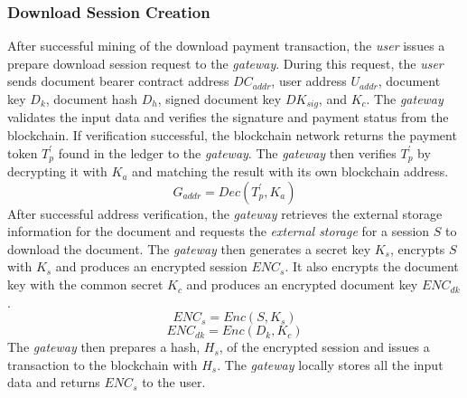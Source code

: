 \subsubsection{Download Session Creation}
After successful mining of the download payment transaction, the {\it user} issues a prepare download session request to the {\it gateway}. During this request, the {\it user} sends document bearer contract address $DC_{addr}$, user address $U_{addr}$, document key $D_k$, document hash $D_h$, signed document key $DK_{sig}$, and $K_c$. The {\it gateway} validates the input data and verifies the signature and payment status from the blockchain. If verification successful, the blockchain network returns the payment token $T_p^\prime$ found in the ledger to the {\it gateway}. The {\it gateway} then verifies $T_p^\prime$ by decrypting it with $K_a$ and matching the result with its own blockchain address. 
\begin{equation}
\label{eq-d-3}
G_{addr} = Dec (T_p^\prime, K_a)
\end{equation}
After successful address verification, the {\it gateway} retrieves the external storage information for the document and requests the {\it external storage} for a session $S$ to download the document. The {\it gateway} then generates a secret key $K_s$,  encrypts $S$ with $K_s$ and produces an encrypted session $ENC_s$. It also encrypts the document key with the common secret $K_c$ and produces an encrypted document key $ENC_{dk}$. 
\begin{equation}
\label{eq-d-4} 
ENC_s = Enc (S, K_s)
\end{equation}
\begin{equation}
\label{eq-d-5} 
ENC_{dk} = Enc (D_k, K_c)
\end{equation}
The {\it gateway} then prepares a hash, $H_s$, of the encrypted session and issues a transaction to the blockchain with $H_s$. The {\it gateway} locally stores all the input data and returns $ENC_s$ to the user.

